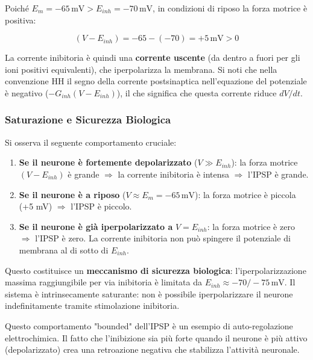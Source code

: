 Poiché $E_m = -65 \, \text{mV} > E_{inh} = -70 \, \text{mV}$, in condizioni di riposo la forza motrice è positiva:

\begin{equation}
(V - E_{inh}) = -65 - (-70) = +5 \, \text{mV} > 0
\end{equation}

La corrente inibitoria è quindi una \textbf{corrente uscente} (da dentro a fuori per gli ioni positivi equivalenti), che iperpolarizza la membrana. Si noti che nella convenzione HH il segno della corrente postsinaptica nell'equazione del potenziale è negativo ($-G_{inh}(V - E_{inh})$), il che significa che questa corrente riduce $dV/dt$.

\subsubsection{Saturazione e Sicurezza Biologica}

Si osserva il seguente comportamento cruciale:

\begin{enumerate}
    \item \textbf{Se il neurone è fortemente depolarizzato} ($V \gg E_{inh}$): la forza motrice $(V - E_{inh})$ è grande $\Rightarrow$ la corrente inibitoria è intensa $\Rightarrow$ l'IPSP è grande.
    \item \textbf{Se il neurone è a riposo} ($V \approx E_m = -65 \, \text{mV}$): la forza motrice è piccola (+5 mV) $\Rightarrow$ l'IPSP è piccolo.
    \item \textbf{Se il neurone è già iperpolarizzato a} $V = E_{inh}$: la forza motrice è zero $\Rightarrow$ l'IPSP è zero. La corrente inibitoria non può spingere il potenziale di membrana al di sotto di $E_{inh}$.
\end{enumerate}

Questo costituisce un \textbf{meccanismo di sicurezza biologica}: l'iperpolarizzazione massima raggiungibile per via inibitoria è limitata da $E_{inh} \approx -70/-75 \, \text{mV}$. Il sistema è intrinsecamente saturante: non è possibile iperpolarizzare il neurone indefinitamente tramite stimolazione inibitoria.

\begin{tcolorbox}[colback=gray!5, colframe=gray!40, arc=2mm, boxrule=0.5pt]
Questo comportamento "bounded" dell'IPSP è un esempio di auto-regolazione elettrochimica. Il fatto che l'inibizione sia più forte quando il neurone è più attivo (depolarizzato) crea una retroazione negativa che stabilizza l'attività neuronale.
\end{tcolorbox}



